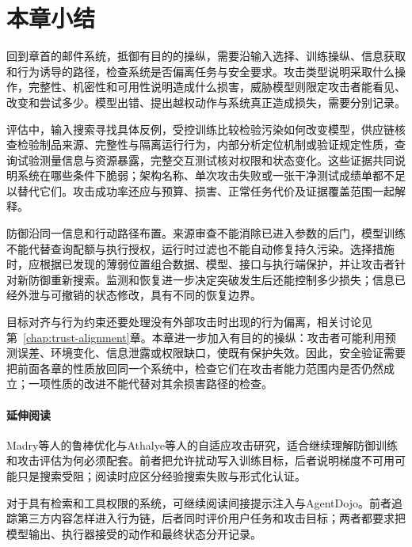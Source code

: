 \FloatBarrier
{}
\section{本章小结}
\label{sec:security-summary}

回到章首的邮件系统，抵御有目的的操纵，需要沿输入选择、训练操纵、信息获取和行为诱导的路径，检查系统是否偏离任务与安全要求。攻击类型说明采取什么操作，完整性、机密性和可用性说明造成什么损害，威胁模型则限定攻击者能看见、改变和尝试多少。模型出错、提出越权动作与系统真正造成损失，需要分别记录。

评估中，输入搜索寻找具体反例，受控训练比较检验污染如何改变模型，供应链核查检验制品来源、完整性与隔离运行行为，内部分析定位机制或验证规定性质，查询试验测量信息与资源暴露，完整交互测试核对权限和状态变化。这些证据共同说明系统在哪些条件下脆弱；架构名称、单次攻击失败或一张干净测试成绩单都不足以替代它们。攻击成功率还应与预算、损害、正常任务代价及证据覆盖范围一起解释。

防御沿同一信息和行动路径布置。来源审查不能消除已进入参数的后门，模型训练不能代替查询配额与执行授权，运行时过滤也不能自动修复持久污染。选择措施时，应根据已发现的薄弱位置组合数据、模型、接口与执行端保护，并让攻击者针对新防御重新搜索。监测和恢复进一步决定突破发生后还能控制多少损失；信息已经外泄与可撤销的状态修改，具有不同的恢复边界。

目标对齐与行为约束还要处理没有外部攻击时出现的行为偏离，相关讨论见第~\ref{chap:trust-alignment}章。本章进一步加入有目的的操纵：攻击者可能利用预测误差、环境变化、信息泄露或权限缺口，使既有保护失效。因此，安全验证需要把前面各章的性质放回同一个系统中，检查它们在攻击者能力范围内是否仍然成立；一项性质的改进不能代替对其余损害路径的检查。

\paragraph{延伸阅读}

Madry等人的鲁棒优化与Athalye等人的自适应攻击研究，适合继续理解防御训练和攻击评估为何必须配套。前者把允许扰动写入训练目标，后者说明梯度不可用可能只是搜索受阻；阅读时应区分经验搜索失败与形式化认证。

对于具有检索和工具权限的系统，可继续阅读间接提示注入与AgentDojo。前者追踪第三方内容怎样进入行为链，后者同时评价用户任务和攻击目标；两者都要求把模型输出、执行器接受的动作和最终状态分开记录。
